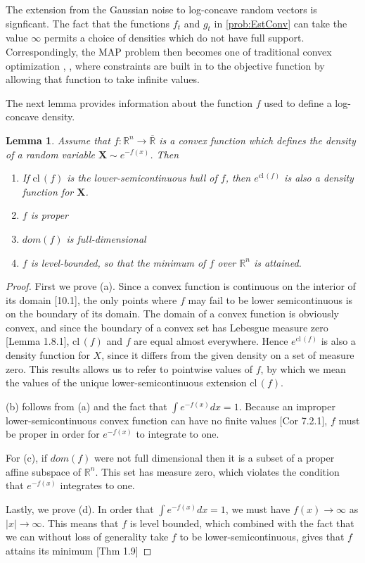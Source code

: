 \documentclass[12pt]{article}
\newcommand{\abs}[1]{\left| #1 \right|}
\renewcommand{\vec}[1]{\mathbf{#1}}
\newtheorem{lemma}[theorem]{Lemma}
\theoremstyle{remark}
\theoremstyle{remark}
\newcommand{\cl}{{\mathrm{cl}\,}}
\begin{document}
The extension from the Gaussian noise to log-concave random vectors is signficant.
The fact that the functions $f_{t}$ and $g_{t}$ in \ref{prob:EstConv} can take the
value $\infty$ permits a choice of densities which do
not have full support. Correspondingly, the MAP problem then becomes
one of traditional convex optimization \cite{ConvAnal},
\cite{VarAnal}, where constraints are built in to the objective
function by allowing that function to take infinite values.

The next lemma provides information about the function $f$ used to
define a log-concave density.

\begin{lemma} \label{Lemma}
Assume that $f:\mathbb{R}^{n} \to \overline{\mathbb{R}}$ is a convex function which
defines the density of a random variable $\vec{X} \sim e^{-f(x)}$.
Then
\begin{enumerate}[label=(\alph*)]
\item  If $\cl(f)$ is the lower-semicontinuous hull of $f$, then
$e^{\cl(f)}$ is also a density function for $\vec{X}$.
\item $f$ is proper
\item $dom(f)$ is full-dimensional
\item $f$ is level-bounded, so that the minimum of $f$ over
$\mathbb{R}^{n}$ is attained.
\end{enumerate}
\end{lemma}

\begin{proof}
First we prove (a). Since
a convex function is continuous on the interior of its domain
\cite{ConvAnal}[10.1], the only points where $f$ may
fail to be lower semicontinuous is on the boundary of its domain. The
domain of a convex function is obviously convex, and since the
boundary of a convex set has Lebesgue measure zero
\cite{jarosz2015function}[Lemma 1.8.1], $\cl(f)$ and $f$ are equal
almost everywhere. Hence $e^{\cl(f)}$ is also a density function for
$X$, since it differs from the given density on a set of measure zero.
This results allows us to refer to pointwise values of $f$, by which
we mean the values of the unique lower-semicontinuous extension
$\cl(f)$.

(b) follows from (a) and the fact that $\int e^{-f(x)} dx =1$.
Because an improper lower-semicontinuous convex function can have no finite
values \cite{ConvAnal}[Cor 7.2.1], $f$ must be proper in order for
$e^{-f(x)}$ to integrate to one.

For (c), if $dom(f)$ were not full dimensional then it is a subset of
a proper affine subspace of $\mathbb{R}^{n}$. This set has measure
zero, which violates the condition that $e^{-f(x)}$ integrates to one.

Lastly, we prove (d). In order that $\int e^{-f(x)} dx = 1$, we must
have $f(x) \to \infty$ as $\abs{x} \to \infty$. This means that $f$ is
level bounded, which combined with the fact that we can without loss
of generality take $f$ to be lower-semicontinuous, gives that $f$
attains its minimum \cite{VarAnal}[Thm 1.9]
\end{proof}
\end{document}
